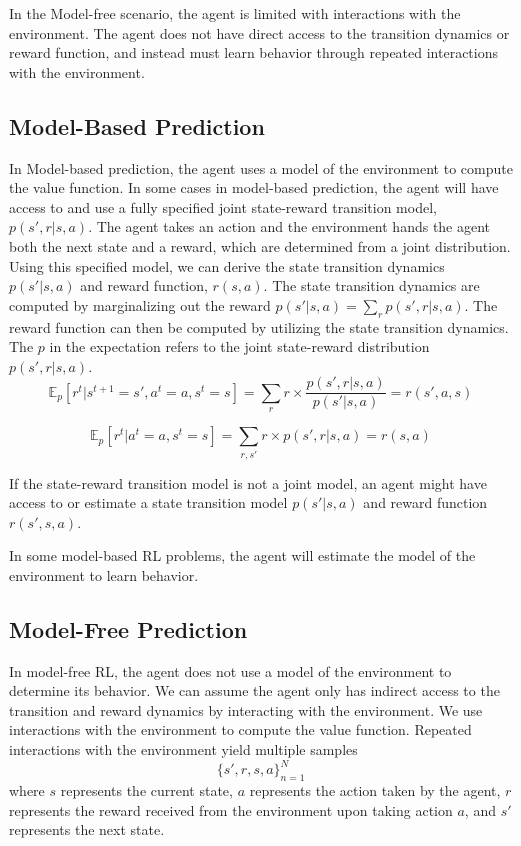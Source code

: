\documentclass[11pt]{article}
\def\EE{\mathbb{E}}
\begin{document}
In the Model-free scenario, the agent is limited with interactions with the environment. The agent does not have direct access to the transition dynamics or reward function, and instead must learn behavior through repeated interactions with the environment. 



\subsection{Model-Based Prediction}

In Model-based prediction, the agent uses a model of the environment to compute the value function. In some cases in model-based prediction, the agent will have access to and use a fully specified joint state-reward transition model, $p(s', r|s,a)$. The agent takes an action and the environment hands the agent both the next state and a reward, which are determined from a joint distribution. Using this specified model, we can derive the state transition dynamics $p(s'|s,a)$ and reward function, $r(s,a)$. The state transition dynamics are computed by marginalizing out the reward $p(s'|s,a) = \sum_r p(s', r|s, a)$. The reward function can then be computed by utilizing the state transition dynamics. The $p$ in the expectation refers to the joint state-reward distribution $p(s', r|s, a)$.
\begin{equation}
    \EE_p[r^t|s^{t+1}=s', a^t=a, s^t = s] = \sum_r r\times \frac{p(s', r|s, a)}{p(s'|s,a)} = r(s', a, s)
\end{equation}

\begin{equation}
    \EE_p[r^t|a^t=a, s^t = s] = \sum_{r, s'} r\times p(s', r|s, a) = r(s, a)
\end{equation}


If the state-reward transition model is not a joint model, an agent might have access to or estimate a state transition model $p(s'|s,a)$ and reward function $r(s',s,a)$. 

In some model-based RL problems, the agent will estimate the model of the environment to learn behavior.


\subsection{Model-Free Prediction}
In model-free RL, the agent does not use a model of the environment to determine its behavior. We can assume the agent only has indirect access to the transition and reward dynamics by interacting with the environment. We use interactions with the environment to compute the value function. Repeated interactions with the environment yield multiple samples $$\{s', r, s, a\}_{n=1}^N$$ where $s$ represents the current state, $a$ represents the action taken by the agent, $r$ represents the reward received from the environment upon taking action $a$, and $s'$ represents the next state.
\end{document}
